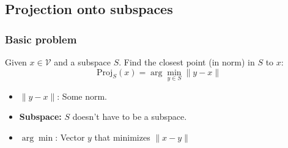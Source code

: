 \subsection{Projection onto subspaces}
    
    \subsubsection{Basic problem}
        \begin{definition}
            Given $x\in \mathcal{V}$ and a subspace $S$. Find the closest point (in norm) in $S$ to $x$: 
            \begin{equation}
                \text{Proj}_S(x) = \arg\min_{y \in S} \| y - x \|
            \end{equation}
            \begin{itemize}
                \item $\| y - x \|$: Some norm.
                \item \textbf{Subspace:} $S$ doesn't have to be a subspace. 
                \item $\arg\min$: Vector $y$ that minimizes $\lVert x - y\rVert$
            \end{itemize}
        \end{definition}
        
